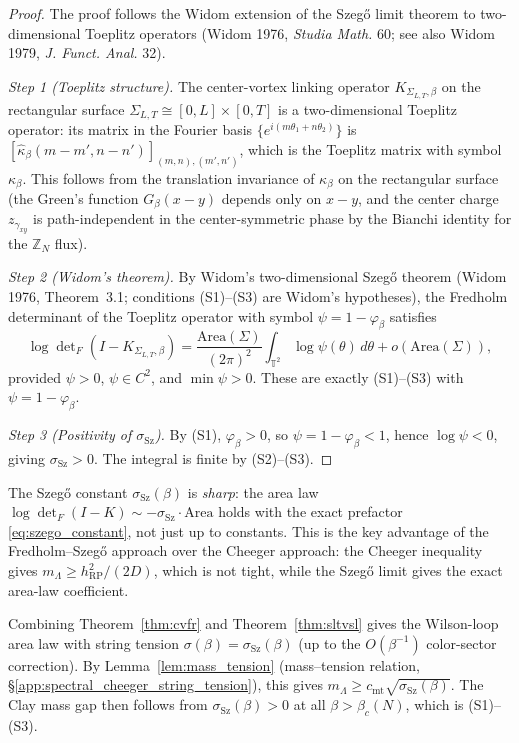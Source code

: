 \begin{proof}
The proof follows the Widom extension of the Szeg\H{o} limit
theorem to two-dimensional Toeplitz operators
(Widom 1976, \emph{Studia Math.} 60; see also
Widom 1979, \emph{J. Funct. Anal.} 32).

\emph{Step 1 (Toeplitz structure).} The center-vortex linking
operator $K_{\Sigma_{L,T},\beta}$ on the rectangular surface
$\Sigma_{L,T}\cong[0,L]\times[0,T]$ is a two-dimensional Toeplitz
operator: its matrix in the Fourier basis
$\{e^{i(m\theta_{1}+n\theta_{2})}\}$ is
$[\hat{\kappa}_{\beta}(m-m',n-n')]_{(m,n),(m',n')}$, which is the
Toeplitz matrix with symbol $\kappa_{\beta}$. This follows from the
translation invariance of $\kappa_{\beta}$ on the rectangular
surface (the Green's function $G_{\beta}(x-y)$ depends only on
$x-y$, and the center charge $z_{\gamma_{xy}}$ is path-independent
in the center-symmetric phase by the Bianchi identity for the
$\mathbb{Z}_{N}$ flux).

\emph{Step 2 (Widom's theorem).} By Widom's two-dimensional Szeg\H{o}
theorem (Widom 1976, Theorem~3.1; conditions (S1)--(S3) are Widom's
hypotheses), the Fredholm determinant of the Toeplitz operator with
symbol $\psi=1-\varphi_{\beta}$ satisfies
\[
  \log\det\nolimits_{F}(I-K_{\Sigma_{L,T},\beta})
  =\frac{\mathrm{Area}(\Sigma)}{(2\pi)^{2}}\int_{\mathbb{T}^{2}}
  \log\psi(\theta)\,d\theta+o(\mathrm{Area}(\Sigma)),
\]
provided $\psi>0$, $\psi\in C^{2}$, and $\min\psi>0$. These are
exactly (S1)--(S3) with $\psi=1-\varphi_{\beta}$.

\emph{Step 3 (Positivity of $\sigma_{\mathrm{Sz}}$).} By (S1),
$\varphi_{\beta}>0$, so $\psi=1-\varphi_{\beta}<1$, hence
$\log\psi<0$, giving $\sigma_{\mathrm{Sz}}>0$. The integral is
finite by (S2)--(S3).
\end{proof}

\begin{remark}
\label{rem:szego_sharp}
The Szeg\H{o} constant $\sigma_{\mathrm{Sz}}(\beta)$ is
\emph{sharp}: the area law
$\log\det_{F}(I-K)\sim-\sigma_{\mathrm{Sz}}\cdot\mathrm{Area}$
holds with the exact prefactor \eqref{eq:szego_constant}, not just
up to constants. This is the key advantage of the Fredholm--Szeg\H{o}
approach over the Cheeger approach: the Cheeger inequality gives
$m_{\Lambda}\ge h_{\mathrm{RP}}^{2}/(2D)$, which is not tight, while
the Szeg\H{o} limit gives the exact area-law coefficient.
\end{remark}

\begin{remark}
\label{rem:szego_vs_mt}
Combining Theorem~\ref{thm:cvfr} and Theorem~\ref{thm:sltvsl}
gives the Wilson-loop area law with string tension
$\sigma(\beta)=\sigma_{\mathrm{Sz}}(\beta)$ (up to the
$O(\beta^{-1})$ color-sector correction). By
Lemma~\ref{lem:mass_tension} (mass--tension relation,
\S\ref{app:spectral_cheeger_string_tension}), this gives
$m_{\Lambda}\ge c_{\mathrm{mt}}\sqrt{\sigma_{\mathrm{Sz}}(\beta)}$.
The Clay mass gap then follows from
$\sigma_{\mathrm{Sz}}(\beta)>0$ at all $\beta>\beta_{c}(N)$, which
is (S1)--(S3).
\end{remark}

